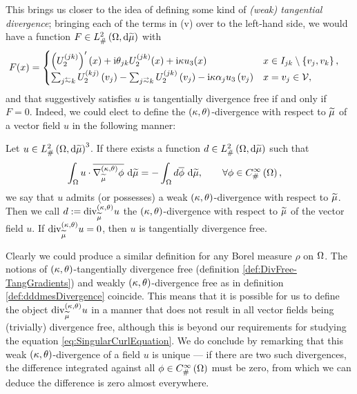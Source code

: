 This brings us closer to the idea of defining some kind of \emph{(weak) tangential divergence}; bringing each of the terms in (v) over to the left-hand side, we would have a function $F\in L^2_{\#}\left( \Omega,\mathrm{d} \widetilde{\mu} \right)$ with
\begin{align} \label{eq:ktDivergence-Guess}
	F(x) &= 
	\begin{cases} 
		\bracs{U_2^{(jk)}}'(x) + \rmi\qm_{jk}U_2^{(jk)}(x) + \rmi\wavenumber u_3(x) &
		x\in I_{jk}\setminus\clbracs{v_j,v_k}, \\
		\sum_{j\conRight k}U_2^{(kj)}\bracs{v_j} - \sum_{j\conLeft k}U_2^{(jk)}\bracs{v_j} -\rmi\wavenumber\alpha_j u_3\bracs{v_j} &
		x=v_j\in\vertSet,
	\end{cases}
\end{align}
and that suggestively satisfies $u$ is tangentially divergence free if and only if $F=0$.
Indeed, we could elect to define the $\left( \kappa, \theta \right)$-divergence with respect to $\widetilde{\mu}$ of a vector field $u$ in the following manner:
\begin{definition} \label{def:dddmesDivergence}
	Let $u\in L^2_{\#}\left( \Omega,\mathrm{d} \widetilde{\mu} \right)^3$.
	If there exists a function $d\in L^2_{\#}\left( \Omega,\mathrm{d} \widetilde{\mu} \right)$ such that
	\begin{align*}
		\int_{\Omega} u\cdot\overline{\nabla^{\left( \kappa, \theta \right)}_{\widetilde{\mu}}\phi}  \ \mathrm{d}\widetilde{\mu}
		&= -\int_{\Omega} d\overline{\phi}  \ \mathrm{d}\widetilde{\mu}, \qquad\forall\phi\in C^{\infty}_{\#}\left( \Omega \right),
	\end{align*}
	we say that $u$ admits (or possesses) a weak $\left( \kappa, \theta \right)$-divergence with respect to $\widetilde{\mu}$.
	Then we call $d:=\mathrm{div}_{\widetilde{\mu}}^{\left( \kappa, \theta \right)}u$ the $\left( \kappa, \theta \right)$-divergence with respect to $\widetilde{\mu}$ of the vector field $u$.
	If $\mathrm{div}_{\widetilde{\mu}}^{\left( \kappa, \theta \right)}u=0$, then $u$ is tangentially divergence free.
\end{definition}
Clearly we could produce a similar definition for any Borel measure $\rho$ on $\Omega$.
The notions of $\left( \kappa, \theta \right)$-tangentially divergence free (definition \ref{def:DivFree-TangGradients}) and weakly $\left( \kappa, \theta \right)$-divergence free as in definition \ref{def:dddmesDivergence} coincide.
This means that it is possible for us to define the object $\mathrm{div}_{\widetilde{\mu}}^{\left( \kappa, \theta \right)}u$ in a manner that does not result in all vector fields being (trivially) divergence free, although this is beyond our requirements for studying the equation \eqref{eq:SingularCurlEquation}.
We do conclude by remarking that this weak $\left( \kappa, \theta \right)$-divergence of a field $u$ is unique --- if there are two such divergences, the difference integrated against all $\phi\in C^{\infty}_{\#}\left( \Omega \right)$ must be zero, from which we can deduce the difference is zero almost everywhere.
